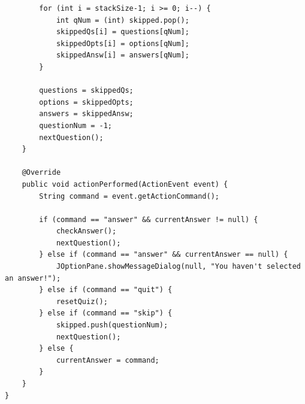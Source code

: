 \documentclass{report}
\begin{document}
\begin{verbatim}
        for (int i = stackSize-1; i >= 0; i--) {
            int qNum = (int) skipped.pop();
            skippedQs[i] = questions[qNum];
            skippedOpts[i] = options[qNum];
            skippedAnsw[i] = answers[qNum];
        }

        questions = skippedQs;
        options = skippedOpts;
        answers = skippedAnsw;
        questionNum = -1;
        nextQuestion();
    }

    @Override
    public void actionPerformed(ActionEvent event) {
        String command = event.getActionCommand();

        if (command == "answer" && currentAnswer != null) {
            checkAnswer();
            nextQuestion();
        } else if (command == "answer" && currentAnswer == null) {
            JOptionPane.showMessageDialog(null, "You haven't selected an answer!");
        } else if (command == "quit") {
            resetQuiz();
        } else if (command == "skip") {
            skipped.push(questionNum);
            nextQuestion();
        } else {
            currentAnswer = command;
        }
    }
}
\end{verbatim}
\end{document}
